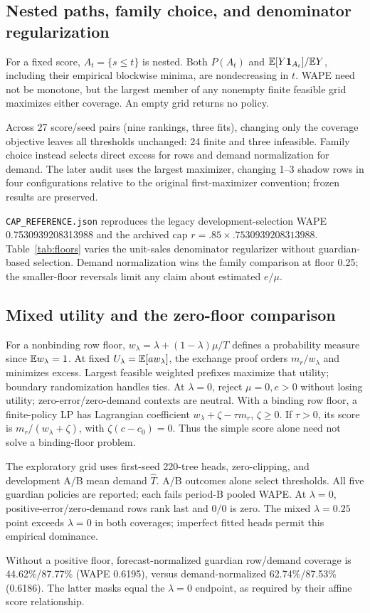 \subsection{Nested paths, family choice, and denominator regularization}
For a fixed score, $A_t=\{s\leq t\}$ is nested. Both $P(A_t)$ and $\mathbb{E}[Y\mathbf{1}_{A_t}]/\mathbb{E} Y$, including their empirical blockwise minima, are nondecreasing in $t$. WAPE need not be monotone, but the largest member of any nonempty finite feasible grid maximizes either coverage. An empty grid returns no policy.

Across 27 score/seed pairs (nine rankings, three fits), changing only the coverage objective leaves all thresholds unchanged: 24 finite and three infeasible. Family choice instead selects direct excess for rows and demand normalization for demand. The later audit uses the largest maximizer, changing 1--3 shadow rows in four configurations relative to the original first-maximizer convention; frozen results are preserved.

\texttt{CAP\_REFERENCE.json} reproduces the legacy development-selection WAPE 0.7530939208313988 and the archived cap $r=.85\times.7530939208313988$. Table~\ref{tab:floors} varies the unit-sales denominator regularizer without guardian-based selection. Demand normalization wins the family comparison at floor 0.25; the smaller-floor reversals limit any claim about estimated $e/\mu$.


\subsection{Mixed utility and the zero-floor comparison}
\label{app:mixed}
For a nonbinding row floor, $w_\lambda=\lambda+(1-\lambda)\mu/T$ defines a probability measure since $\mathbb{E} w_\lambda=1$. At fixed $U_\lambda=\mathbb{E}[aw_\lambda]$, the exchange proof orders $m_r/w_\lambda$ and minimizes excess. Largest feasible weighted prefixes maximize that utility; boundary randomization handles ties. At $\lambda=0$, reject $\mu=0,e>0$ without losing utility; zero-error/zero-demand contexts are neutral. With a binding row floor, a finite-policy LP has Lagrangian coefficient $w_\lambda+\zeta-\tau m_r$, $\zeta\geq0$. If $\tau>0$, its score is $m_r/(w_\lambda+\zeta)$, with $\zeta(c-c_0)=0$. Thus the simple score alone need not solve a binding-floor problem.

The exploratory grid uses first-seed 220-tree heads, zero-clipping, and development A/B mean demand $\hat T$. A/B outcomes alone select thresholds. All five guardian policies are reported; each fails period-B pooled WAPE. At $\lambda=0$, positive-error/zero-demand rows rank last and $0/0$ is zero. The mixed $\lambda=0.25$ point exceeds $\lambda=0$ in both coverages; imperfect fitted heads permit this empirical dominance.


Without a positive floor, forecast-normalized guardian row/demand coverage is 44.62\%/87.77\% (WAPE 0.6195), versus demand-normalized 62.74\%/87.53\% (0.6186). The latter masks equal the $\lambda=0$ endpoint, as required by their affine score relationship.

